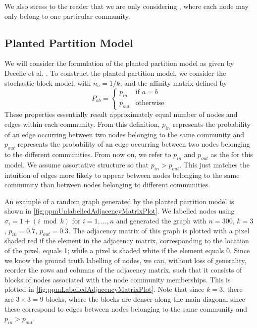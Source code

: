 We also stress to the reader that we are only considering , where each node may only belong to one particular community.


\subsection{Planted Partition Model}
\label{subsec:plantedPartitionModel}

We will consider the formulation of the planted partition model as given by Decelle et al. \cite{DKM+13}.
To construct the planted partition model, we consider the stochastic block model, with $n_{a} = 1/k$, and the affinity matrix defined by
\begin{equation}
	\label{def:ppmAffinityMatrix}
	P_{ab} =
	\begin{cases}
		p_{in} & \text{if } a = b\\
		p_{out} & \text{otherwise}
	\end{cases}
\end{equation}
These properties essentially result approximately equal number of nodes and edges within each community.
From this definition, $p_{in}$ represents the probability of an edge occurring between two nodes belonging to the same community and $p_{out}$ represents the probability of an edge occurring between two nodes belonging to the different communities.
From now on, we refer to $p_{in}$ and $p_{out}$ as the  for this model.
We assume assortative structure so that $p_{in} > p_{out}$. This just matches the intuition of edges more likely to appear between nodes belonging to the same community than between nodes belonging to different communities.

An example of a random graph generated by the planted partition model is shown in \cref{fig:ppmUnlabelledAdjacencyMatrixPlot}.
We labelled nodes using $\sigma_{i} = 1 + (i \bmod{k})$ for $i = 1,\dots,n$ and generated the graph with $n = 300$, $k = 3$, $p_{in} = 0.7$, $p_{out} = 0.3$.
The adjacency matrix of this graph is plotted with a pixel shaded red if the element in the adjacency matrix, corresponding to the location of the pixel, equals 1; while a pixel is shaded white if the element equals 0.
Since we know the ground truth labelling of nodes, we can, without loss of generality, reorder the rows and columns of the adjacency matrix, such that it consists of blocks of nodes associated with the node community memberships.
This is plotted in \cref{fig:ppmLabelledAdjacencyMatrixPlot}. Note that since $k = 3$, there are $3 \times 3 = 9$ blocks, where the blocks are denser along the main diagonal since these correspond to edges between nodes belonging to the same community and $p_{in} > p_{out}$.

